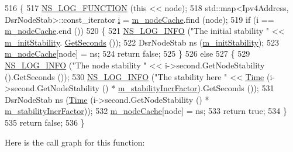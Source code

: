 \begin{DoxyCode}
516 \{
517   \hyperlink{log-macros-disabled_8h_a90b90d5bad1f39cb1b64923ea94c0761}{NS\_LOG\_FUNCTION} (\textcolor{keyword}{this} << node);
518   std::map<Ipv4Address, DsrNodeStab>::const\_iterator \hyperlink{bernuolliDistribution_8m_a6f6ccfcf58b31cb6412107d9d5281426}{i} = \hyperlink{classns3_1_1dsr_1_1DsrRouteCache_a2ad918da9614405b305be6c18ed04502}{m\_nodeCache}.find (node);
519   \textcolor{keywordflow}{if} (i == \hyperlink{classns3_1_1dsr_1_1DsrRouteCache_a2ad918da9614405b305be6c18ed04502}{m\_nodeCache}.end ())
520     \{
521       \hyperlink{group__logging_gafbd73ee2cf9f26b319f49086d8e860fb}{NS\_LOG\_INFO} (\textcolor{stringliteral}{"The initial stability "} << \hyperlink{classns3_1_1dsr_1_1DsrRouteCache_a33fe450058c846a3ebdd386ad5a11208}{m\_initStability}.
      \hyperlink{classns3_1_1Time_a8f20d5c3b0902d7b4320982f340b57c8}{GetSeconds} ());
522       DsrNodeStab ns (\hyperlink{classns3_1_1dsr_1_1DsrRouteCache_a33fe450058c846a3ebdd386ad5a11208}{m\_initStability});
523       \hyperlink{classns3_1_1dsr_1_1DsrRouteCache_a2ad918da9614405b305be6c18ed04502}{m\_nodeCache}[node] = ns;
524       \textcolor{keywordflow}{return} \textcolor{keyword}{false};
525     \}
526   \textcolor{keywordflow}{else}
527     \{
529       \hyperlink{group__logging_gafbd73ee2cf9f26b319f49086d8e860fb}{NS\_LOG\_INFO} (\textcolor{stringliteral}{"The node stability "} << i->second.GetNodeStability ().GetSeconds ());
530       \hyperlink{group__logging_gafbd73ee2cf9f26b319f49086d8e860fb}{NS\_LOG\_INFO} (\textcolor{stringliteral}{"The stability here "} << \hyperlink{namespacens3_1_1TracedValueCallback_a7ffd3e7c142ffe7c8a1d2db9b8de38ec}{Time} (i->second.GetNodeStability () * 
      \hyperlink{classns3_1_1dsr_1_1DsrRouteCache_a4fb68651a11cfafbb027660a4b42734e}{m\_stabilityIncrFactor}).GetSeconds ());
531       DsrNodeStab ns (\hyperlink{namespacens3_1_1TracedValueCallback_a7ffd3e7c142ffe7c8a1d2db9b8de38ec}{Time} (i->second.GetNodeStability () * 
      \hyperlink{classns3_1_1dsr_1_1DsrRouteCache_a4fb68651a11cfafbb027660a4b42734e}{m\_stabilityIncrFactor}));
532       \hyperlink{classns3_1_1dsr_1_1DsrRouteCache_a2ad918da9614405b305be6c18ed04502}{m\_nodeCache}[node] = ns;
533       \textcolor{keywordflow}{return} \textcolor{keyword}{true};
534     \}
535   \textcolor{keywordflow}{return} \textcolor{keyword}{false};
536 \}
\end{DoxyCode}


Here is the call graph for this function\+:




